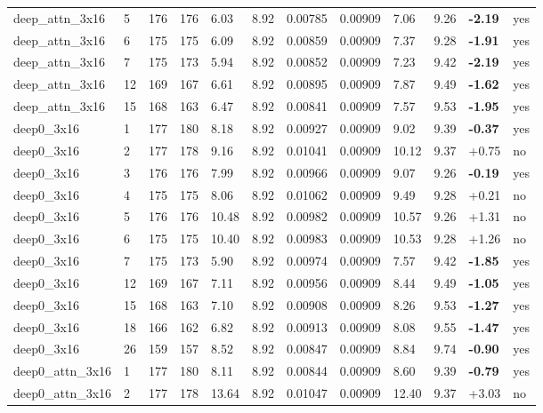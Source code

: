 \documentclass[10pt,a4paper]{article}
\begin{document}
\begin{landscape}
\begin{footnotesize}
\begin{longtable}{llllllllllll}
deep\_attn\_3x16 & 5 & 176 & 176 & 6.03 & 8.92 & 0.00785 & 0.00909 & 7.06 & 9.26 & \textbf{-2.19} & yes \\
deep\_attn\_3x16 & 6 & 175 & 175 & 6.09 & 8.92 & 0.00859 & 0.00909 & 7.37 & 9.28 & \textbf{-1.91} & yes \\
deep\_attn\_3x16 & 7 & 175 & 173 & 5.94 & 8.92 & 0.00852 & 0.00909 & 7.23 & 9.42 & \textbf{-2.19} & yes \\
deep\_attn\_3x16 & 12 & 169 & 167 & 6.61 & 8.92 & 0.00895 & 0.00909 & 7.87 & 9.49 & \textbf{-1.62} & yes \\
deep\_attn\_3x16 & 15 & 168 & 163 & 6.47 & 8.92 & 0.00841 & 0.00909 & 7.57 & 9.53 & \textbf{-1.95} & yes \\
deep0\_3x16 & 1 & 177 & 180 & 8.18 & 8.92 & 0.00927 & 0.00909 & 9.02 & 9.39 & \textbf{-0.37} & yes \\
deep0\_3x16 & 2 & 177 & 178 & 9.16 & 8.92 & 0.01041 & 0.00909 & 10.12 & 9.37 & +0.75 & no \\
deep0\_3x16 & 3 & 176 & 176 & 7.99 & 8.92 & 0.00966 & 0.00909 & 9.07 & 9.26 & \textbf{-0.19} & yes \\
deep0\_3x16 & 4 & 175 & 175 & 8.06 & 8.92 & 0.01062 & 0.00909 & 9.49 & 9.28 & +0.21 & no \\
deep0\_3x16 & 5 & 176 & 176 & 10.48 & 8.92 & 0.00982 & 0.00909 & 10.57 & 9.26 & +1.31 & no \\
deep0\_3x16 & 6 & 175 & 175 & 10.40 & 8.92 & 0.00983 & 0.00909 & 10.53 & 9.28 & +1.26 & no \\
deep0\_3x16 & 7 & 175 & 173 & 5.90 & 8.92 & 0.00974 & 0.00909 & 7.57 & 9.42 & \textbf{-1.85} & yes \\
deep0\_3x16 & 12 & 169 & 167 & 7.11 & 8.92 & 0.00956 & 0.00909 & 8.44 & 9.49 & \textbf{-1.05} & yes \\
deep0\_3x16 & 15 & 168 & 163 & 7.10 & 8.92 & 0.00908 & 0.00909 & 8.26 & 9.53 & \textbf{-1.27} & yes \\
deep0\_3x16 & 18 & 166 & 162 & 6.82 & 8.92 & 0.00913 & 0.00909 & 8.08 & 9.55 & \textbf{-1.47} & yes \\
deep0\_3x16 & 26 & 159 & 157 & 8.52 & 8.92 & 0.00847 & 0.00909 & 8.84 & 9.74 & \textbf{-0.90} & yes \\
deep0\_attn\_3x16 & 1 & 177 & 180 & 8.11 & 8.92 & 0.00844 & 0.00909 & 8.60 & 9.39 & \textbf{-0.79} & yes \\
deep0\_attn\_3x16 & 2 & 177 & 178 & 13.64 & 8.92 & 0.01047 & 0.00909 & 12.40 & 9.37 & +3.03 & no \\
\bottomrule \end{longtable}
\end{footnotesize}
\end{landscape}
\end{document}
